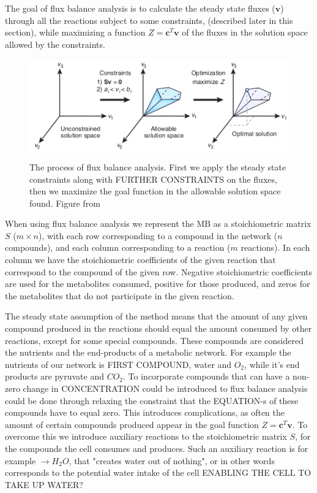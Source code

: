 \documentclass[10pt,a4paper]{article}
\begin{document}
	The goal of flux balance analysis is to calculate the steady state fluxes ($\mathbf{v}$) through all the reactions subject to some constraints, (described later in this section), while maximizing a function $Z=\mathbf{c}^T \mathbf{v}$ of the fluxes in the solution space allowed by the constraints. 

	\begin{figure}[t]
		\centering
		\includegraphics[width=0.8\linewidth]{fba_frompaper.png}
		\caption{The process of flux balance analysis. First we apply the steady state constraints along with FURTHER CONSTRAINTS on the fluxes, then we maximize the goal function in the allowable solution space found. Figure from \cite[]{whatisfluxbalance} }
		\label{fig:fluxbalance}
	\end{figure}

	When using flux balance analysis we represent the MB as a stoichiometric matrix $S$ ($m\times n$), with each row corresponding to a compound in the network ($n$ compounds), and each column corresponding to a reaction ($m$ reactions). In each column we have the stoichiometric coefficients of the given reaction that correspond to the compound of the given row. Negative stoichiometric coefficients are used for the metabolites consumed, positive for those produced, and zeros for the metabolites that do not participate in the given reaction.
 
	The steady state assumption of the method means that the amount of any given compound produced in the reactions should equal the amount consumed by other reactions, except for some special compounds. These compounds are considered the nutrients and the end-products of a metabolic network. For example the nutrients of our network is FIRST COMPOUND, water and $O_2$, while it's end products are pyruvate and $CO_2$. To incorporate compounds that can have a non-zero change in CONCENTRATION could be introduced to flux balance analysis could be done through relaxing the constraint that the EQUATION-s of these compounds have to equal zero. This introduces complications, as often the amount of certain compounds produced appear in the goal function  $Z=\mathbf{c}^T \mathbf{v}$. To overcome this we introduce auxiliary reactions to the stoichiometric matrix $S$, for the compounds the cell consumes and produces. Such an auxiliary reaction is for example $ \rightarrow H_2O$, that "creates water out of nothing", or in other words corresponds to the potential water intake of the cell ENABLING THE CELL TO TAKE UP WATER?
\end{document}
